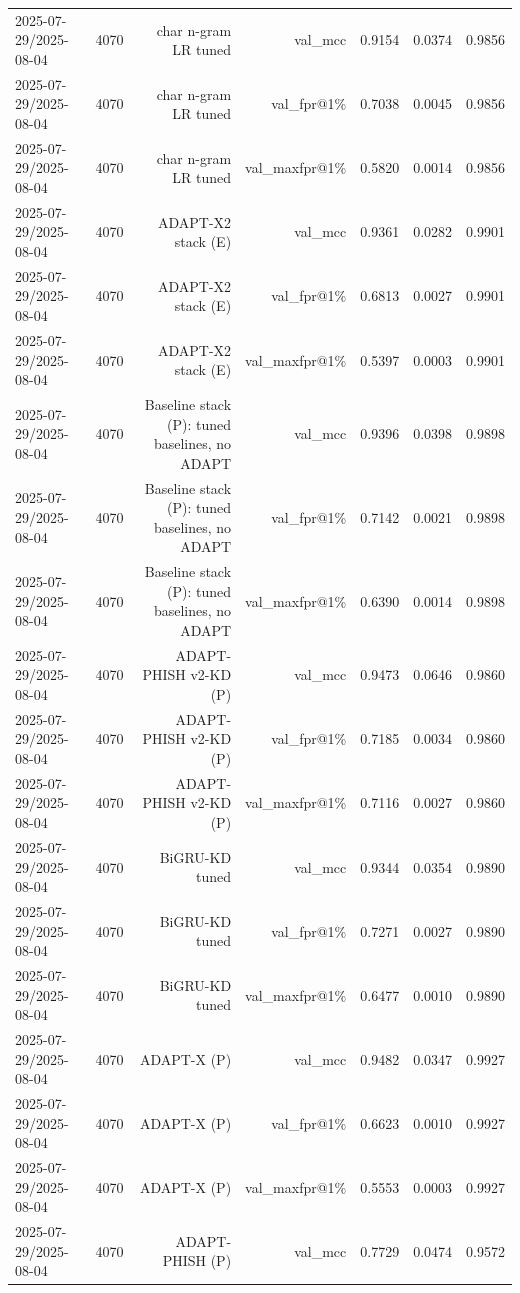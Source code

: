 \begin{table}[t]
\begin{tabular}{llrrrrr}
2025-07-29/2025-08-04 & 4070 & char n-gram LR tuned & val\_mcc & 0.9154 & 0.0374 & 0.9856 \\
2025-07-29/2025-08-04 & 4070 & char n-gram LR tuned & val\_fpr@1\% & 0.7038 & 0.0045 & 0.9856 \\
2025-07-29/2025-08-04 & 4070 & char n-gram LR tuned & val\_maxfpr@1\% & 0.5820 & 0.0014 & 0.9856 \\
2025-07-29/2025-08-04 & 4070 & ADAPT-X2 stack (E) & val\_mcc & 0.9361 & 0.0282 & 0.9901 \\
2025-07-29/2025-08-04 & 4070 & ADAPT-X2 stack (E) & val\_fpr@1\% & 0.6813 & 0.0027 & 0.9901 \\
2025-07-29/2025-08-04 & 4070 & ADAPT-X2 stack (E) & val\_maxfpr@1\% & 0.5397 & 0.0003 & 0.9901 \\
2025-07-29/2025-08-04 & 4070 & Baseline stack (P): tuned baselines, no ADAPT & val\_mcc & 0.9396 & 0.0398 & 0.9898 \\
2025-07-29/2025-08-04 & 4070 & Baseline stack (P): tuned baselines, no ADAPT & val\_fpr@1\% & 0.7142 & 0.0021 & 0.9898 \\
2025-07-29/2025-08-04 & 4070 & Baseline stack (P): tuned baselines, no ADAPT & val\_maxfpr@1\% & 0.6390 & 0.0014 & 0.9898 \\
2025-07-29/2025-08-04 & 4070 & ADAPT-PHISH v2-KD (P) & val\_mcc & 0.9473 & 0.0646 & 0.9860 \\
2025-07-29/2025-08-04 & 4070 & ADAPT-PHISH v2-KD (P) & val\_fpr@1\% & 0.7185 & 0.0034 & 0.9860 \\
2025-07-29/2025-08-04 & 4070 & ADAPT-PHISH v2-KD (P) & val\_maxfpr@1\% & 0.7116 & 0.0027 & 0.9860 \\
2025-07-29/2025-08-04 & 4070 & BiGRU-KD tuned & val\_mcc & 0.9344 & 0.0354 & 0.9890 \\
2025-07-29/2025-08-04 & 4070 & BiGRU-KD tuned & val\_fpr@1\% & 0.7271 & 0.0027 & 0.9890 \\
2025-07-29/2025-08-04 & 4070 & BiGRU-KD tuned & val\_maxfpr@1\% & 0.6477 & 0.0010 & 0.9890 \\
2025-07-29/2025-08-04 & 4070 & ADAPT-X (P) & val\_mcc & 0.9482 & 0.0347 & 0.9927 \\
2025-07-29/2025-08-04 & 4070 & ADAPT-X (P) & val\_fpr@1\% & 0.6623 & 0.0010 & 0.9927 \\
2025-07-29/2025-08-04 & 4070 & ADAPT-X (P) & val\_maxfpr@1\% & 0.5553 & 0.0003 & 0.9927 \\
2025-07-29/2025-08-04 & 4070 & ADAPT-PHISH (P) & val\_mcc & 0.7729 & 0.0474 & 0.9572 \\

\end{tabular}
\end{table}
